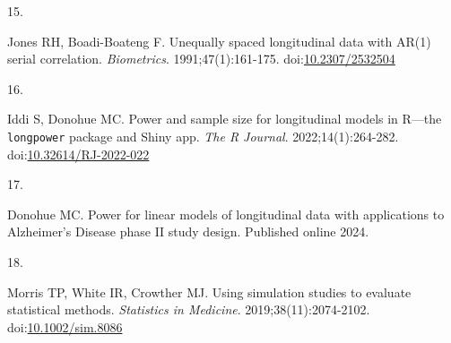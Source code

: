 \documentclass[
  11pt,
]{article}
\newlength{\cslhangindent}
\newlength{\csllabelwidth}
\newenvironment{CSLReferences}[2] %
 {\begin{list}{}{%
  \setlength{\itemindent}{0pt}
  \setlength{\leftmargin}{0pt}
  \setlength{\parsep}{0pt}
  \ifodd #1
   \setlength{\leftmargin}{\cslhangindent}
   \setlength{\itemindent}{-1\cslhangindent}
  \fi
  \setlength{\itemsep}{#2\baselineskip}}}
 {\end{list}}
\newcommand{\CSLLeftMargin}[1]{\parbox[t]{\csllabelwidth}{\strut#1\strut}}
\newcommand{\CSLRightInline}[1]{\parbox[t]{\linewidth - \csllabelwidth}{\strut#1\strut}}
\begin{document}
\begin{CSLReferences}{0}{1}
\CSLLeftMargin{15. }%
\CSLRightInline{Jones RH, Boadi-Boateng F. Unequally spaced longitudinal data with {AR(1)} serial correlation. \emph{Biometrics}. 1991;47(1):161-175. doi:\href{https://doi.org/10.2307/2532504}{10.2307/2532504}}

\CSLLeftMargin{16. }%
\CSLRightInline{Iddi S, Donohue MC. Power and sample size for longitudinal models in {R}---the \texttt{longpower} package and {Shiny} app. \emph{The R Journal}. 2022;14(1):264-282. doi:\href{https://doi.org/10.32614/RJ-2022-022}{10.32614/RJ-2022-022}}

\CSLLeftMargin{17. }%
\CSLRightInline{Donohue MC. Power for linear models of longitudinal data with applications to {Alzheimer's Disease} phase {II} study design. Published online 2024.}

\CSLLeftMargin{18. }%
\CSLRightInline{Morris TP, White IR, Crowther MJ. Using simulation studies to evaluate statistical methods. \emph{Statistics in Medicine}. 2019;38(11):2074-2102. doi:\href{https://doi.org/10.1002/sim.8086}{10.1002/sim.8086}}

\end{CSLReferences}
\end{document}
